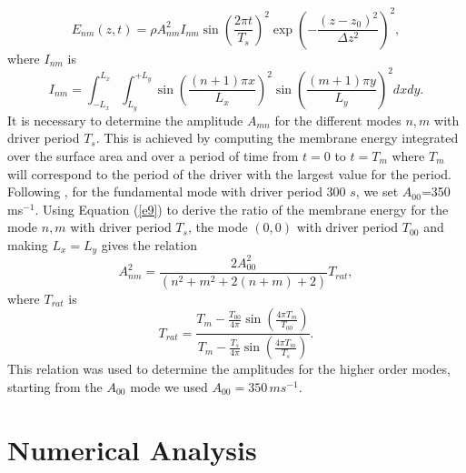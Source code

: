 \documentclass[preprint,authoryear,12pt]{elsarticle}
\begin{document}
\begin{equation}
E_{nm}(z,t)= \rho A_{nm}^{2} I_{nm}  \sin{\left(\frac{2\pi t}{T_s} \right)}^2
\exp{\left( -\frac{(z-z_0)^2}{\Delta z^{2}} \right)}^2,
\label{e9}
\end{equation}
where $I_{nm}$ is
$$
I_{nm}= \int_{-L_{x}}^{L_{x}} \int_{L_{y}}^{+L_{y}} \sin{\left(\frac{(n+1)\pi x}{L_x} \right)}^{2}   \sin{\left(  \frac{(m+1)\pi y}{L_y} \right)}^{2}dxdy. 
$$
It is necessary to determine the amplitude $A_{mn}$ for the different modes $n, m$ with driver period 
$T_{s}$. This is achieved by computing the membrane energy integrated over the surface area and 
over a period of time from $t=0$ to $t=T_{m}$ where $T_m$ will correspond to the period of the driver 
with the largest value for the period. Following  \citet{Leighton1960}, for the fundamental mode with 
driver period 300 $s$, we set $A_{00}$=350\, ms$^{-1}$. 
Using Equation (\ref{e9}) to derive the ratio of the membrane energy for the mode $n, m$ with 
driver period $T_{s}$, the mode $(0, 0)$ with driver period $T_{00}$ and making $L_x=L_y$ 
gives the relation
\begin{equation}
A_{nm}^{2}=\frac{2A_{00}^{2}}{(n^2+m^2+2(n+m)+2)}T_{rat},
\label{e10}
\end{equation}
where $T_{rat}$ is
$$
T_{rat}=
\frac{T_m-\frac{T_{00}}{4\pi}   \sin(\frac{4\pi T_m}{T_{00}})    }{T_m-\frac{T_{s}}{4\pi}   \sin(\frac{4\pi T_m}{T_{s}})}. 
$$
This relation was used to determine the amplitudes for the higher order modes, starting from the $A_{00}$ mode we used  $A_{00}=350\, ms^{-1}$.

\section{Numerical Analysis}
\end{document}
